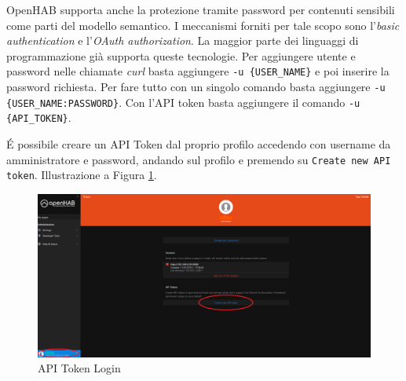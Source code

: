 OpenHAB supporta anche la protezione tramite password per contenuti sensibili come parti del modello semantico. I meccanismi forniti per tale scopo sono l'{\em basic authentication} e l'{\em OAuth authorization}. La maggior parte dei linguaggi di programmazione già supporta queste tecnologie. Per aggiungere utente e password nelle chiamate {\em curl} basta aggiungere \texttt{-u \{USER\_NAME\}} e poi inserire la password richiesta. Per fare tutto con un singolo comando basta aggiungere \texttt{-u \{USER\_NAME:PASSWORD\}}. Con l'API token basta aggiungere il comando \texttt{-u \{API\_TOKEN\}}.

\'E possibile creare un API Token dal proprio profilo accedendo con username da amministratore e password, andando sul profilo e premendo su \texttt{Create new API token}. Illustrazione a Figura \ref{fig:apitoken_login}.

\begin{figure}
    \centering
    \includegraphics[width=14cm]{Immagini/apitoken_login}
    \caption{API Token Login}
    \label{fig:apitoken_login}
\end{figure}